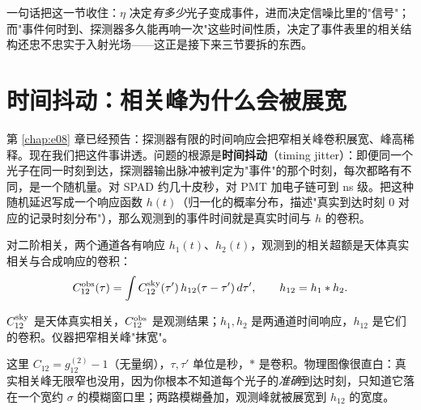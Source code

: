 一句话把这一节收住：\(\eta\) 决定\emph{有多少}光子变成事件，进而决定信噪比里的"信号"；而"事件何时到、探测器多久能再响一次"这些时间性质，决定了事件表里的相关结构还忠不忠实于入射光场——这正是接下来三节要拆的东西。

\section{时间抖动：相关峰为什么会被展宽}
\label{sec:e13-jitter}

第 \ref{chap:e08} 章已经预告：探测器有限的时间响应会把窄相关峰卷积展宽、峰高稀释。现在我们把这件事讲透。问题的根源是\textbf{时间抖动}（timing jitter）：即便同一个光子在同一时刻到达，探测器输出脉冲被判定为"事件"的那个时刻，每次都略有不同，是一个随机量。对 SPAD 约几十皮秒，对 PMT 加电子链可到 ns 级。把这种随机延迟写成一个响应函数 \(h(t)\)（归一化的概率分布，描述"真实到达时刻 0 对应的记录时刻分布"），那么观测到的事件时间就是真实时间与 \(h\) 的卷积。

对二阶相关，两个通道各有响应 \(h_1(t)\)、\(h_2(t)\)，观测到的相关超额是天体真实相关与合成响应的卷积：
\begin{equation}
  C^{\rm obs}_{12}(\tau)
  =
  \int C^{\rm sky}_{12}(\tau')\,
  h_{12}(\tau-\tau')\,d\tau',
  \qquad
  h_{12}=h_1*h_2.
  \label{eq:e13-response-convolution}
\end{equation}
\begin{formulaexplain}
\(C^{\rm sky}_{12}\) 是天体真实相关，\(C^{\rm obs}_{12}\) 是观测结果；\(h_1,h_2\) 是两通道时间响应，\(h_{12}\) 是它们的卷积。仪器把窄相关峰"抹宽"。
\end{formulaexplain}
这里 \(C_{12}=g^{(2)}_{12}-1\)（无量纲），\(\tau,\tau'\) 单位是秒，\(*\) 是卷积。物理图像很直白：真实相关峰无限窄也没用，因为你根本不知道每个光子的\emph{准确}到达时刻，只知道它落在一个宽约 \(\sigma\) 的模糊窗口里；两路模糊叠加，观测峰就被展宽到 \(h_{12}\) 的宽度。

